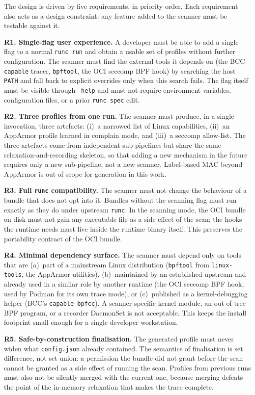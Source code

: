 The design is driven by five requirements, in priority order. Each requirement also acts as a design constraint: any feature added to the scanner must be testable against it.

\textbf{R1. Single-flag user experience.} A developer must be able to add a single flag to a normal \texttt{runc run} and obtain a usable set of profiles without further configuration. The scanner must find the external tools it depends on (the BCC \texttt{capable} tracer, \texttt{bpftool}, the OCI seccomp BPF hook) by searching the host \texttt{PATH} and fall back to explicit overrides only when this search fails. The flag itself must be visible through \texttt{--help} and must not require environment variables, configuration files, or a prior \texttt{runc spec} edit.

\textbf{R2. Three profiles from one run.} The scanner must produce, in a single invocation, three artefacts: (i)~a narrowed list of Linux capabilities, (ii)~an AppArmor profile learned in complain mode, and (iii)~a seccomp allow-list. The three artefacts come from independent sub-pipelines but share the same relaxation-and-recording skeleton, so that adding a new mechanism in the future requires only a new sub-pipeline, not a new scanner. Label-based MAC beyond AppArmor is out of scope for generation in this work.

\textbf{R3. Full \texttt{runc} compatibility.} The scanner must not change the behaviour of a bundle that does not opt into it. Bundles without the scanning flag must run exactly as they do under upstream \texttt{runc}. In the scanning mode, the OCI bundle on disk must not gain any executable file as a side effect of the scan; the hooks the runtime needs must live inside the runtime binary itself. This preserves the portability contract of the OCI bundle.

\textbf{R4. Minimal dependency surface.} The scanner must depend only on tools that are (a)~part of a mainstream Linux distribution (\texttt{bpftool} from \texttt{linux-tools}, the AppArmor utilities), (b)~maintained by an established upstream and already used in a similar role by another runtime (the OCI seccomp BPF hook, used by Podman for its own trace mode), or (c)~published as a kernel-debugging helper (BCC's \texttt{capable-bpfcc}). A scanner-specific kernel module, an out-of-tree BPF program, or a recorder DaemonSet is not acceptable. This keeps the install footprint small enough for a single developer workstation.

\textbf{R5. Safe-by-construction finalisation.} The generated profile must never widen what \texttt{config.json} already contained. The semantics of finalisation is set difference, not set union: a permission the bundle did not grant before the scan cannot be granted as a side effect of running the scan. Profiles from previous runs must also not be silently merged with the current one, because merging defeats the point of the in-memory relaxation that makes the trace complete.


